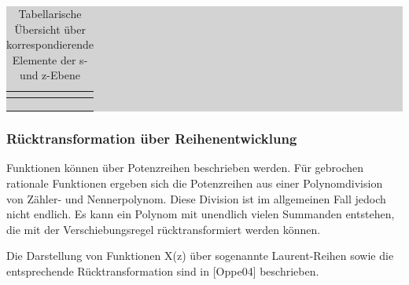 \begin{table}[H]
\setlength{\arrayrulewidth}{.1em}
\caption{Tabellarische \"{U}bersicht \"{u}ber korrespondierende Elemente der s- und z-Ebene}
\setlength{\fboxsep}{0pt}%
\colorbox{lightgray}{%
%
\begin{tabular}{| c | c |}
\hline
\parbox[c][0.35in][c]{3.3in}{\smallskip\centering\textbf{\selectfont{Pollage}}} & \parbox[c][0.35in][c]{3.3in}{\smallskip\centering\textbf{\selectfont{Ansatz Partialbruchzerlegung}}}\\ \hline

\parbox[c][0.8in][c]{3.3in}{} & 
\parbox[c][0.8in][c]{3.3in}{}\\ \hline

\parbox[c][0.8in][c]{3.3in}{} & 
\parbox[c][0.8in][c]{3.3in}{}\\ \hline

\parbox[c][0.8in][c]{3.3in}{} & 
\parbox[c][0.8in][c]{3.3in}{}\\ \hline


\end{tabular}%
}
\label{tab:fivesix}
\end{table}

\subsubsection{R\"{u}cktransformation \"{u}ber Reihenentwicklung}

\noindent Funktionen k\"{o}nnen \"{u}ber Potenzreihen beschrieben werden. F\"{u}r gebrochen rationale Funktionen ergeben sich die Potenzreihen aus einer Polynomdivision von Z\"{a}hler- und Nennerpolynom. Diese Division ist im allgemeinen Fall jedoch nicht endlich. Es kann ein Polynom mit unendlich vielen Summanden entstehen, die mit der Verschiebungsregel r\"{u}cktransformiert werden k\"{o}nnen. \bigskip

\noindent Die Darstellung von Funktionen X(z) \"{u}ber sogenannte Laurent-Reihen sowie die entsprechende R\"{u}cktransformation sind in [Oppe04] beschrieben.\bigskip

